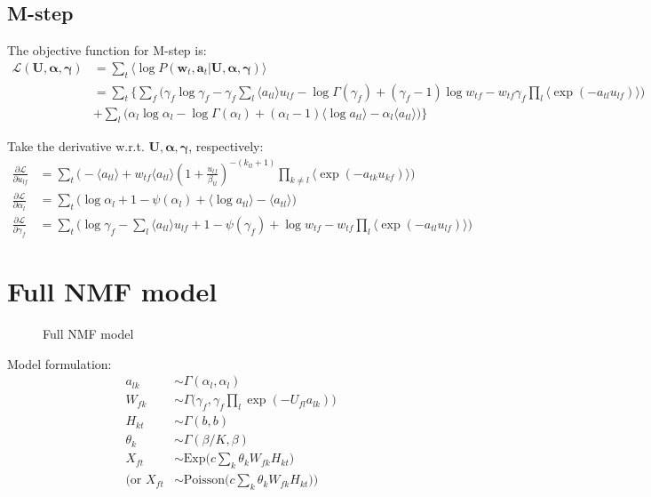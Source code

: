 \documentclass{article}
\begin{document}
\subsection{M-step}
The objective function for M-step is:
\begin{align*}
\mathcal{L}(\mathbf{U}, \bm{\alpha}, \bm{\gamma}) &= \sum_t \langle \log P(\bm{w}_t, \bm{a}_t | \mathbf{U}, \bm{\alpha}, \bm{\gamma}) \rangle \\
&= \sum_t  \biggl\{ \sum_f \Big( \gamma_f \log \gamma_f - \gamma_ f \sum_l \langle a_{tl} \rangle u_{lf} - \log\Gamma(\gamma_f) + (\gamma_f - 1)\log w_{tf} - w_{tf} \gamma_f \prod_l \langle \exp(-a_{tl} u_{lf}) \rangle \Big)  \\
&+ \sum_l  \Big( \alpha_l \log \alpha_l - \log \Gamma(\alpha_l) + (\alpha_l - 1)\langle \log a_{tl} \rangle - \alpha_l \langle a_{tl}  \rangle \Big) \biggl\}
\end{align*}

Take the derivative w.r.t. $\mathbf{U}, \bm{\alpha}, \bm{\gamma}$, respectively:
\begin{align*}
\frac{\partial \mathcal{L}}{\partial u_{lf}} &= \sum_t \biggl( - \langle a_{tl} \rangle + w_{tf} \langle a_{tl} \rangle (1 + \frac{u_{lf}}{\beta_{tl}})^{-(k_{tl}+1)}  \prod_{k \neq l} \langle \exp(-a_{tk} u_{kf}) \rangle \biggl)\\
\frac{\partial \mathcal{L}}{\partial \alpha_l} &=  \sum_t \biggl( \log \alpha_l + 1 - \psi(\alpha_l) + \langle \log a_{tl} \rangle - \langle a_{tl} \rangle \biggl)\\
\frac{\partial \mathcal{L}}{\partial \gamma_f} &= \sum_t \biggl( \log \gamma_f - \sum_l \langle a_{tl} \rangle u_{lf} + 1 - \psi(\gamma_f) + \log w_{tf} - w_{tf} \prod_l \langle \exp(-a_{tl} u_{lf}) \rangle \biggl)
\end{align*}

\section{Full NMF model}
\begin{figure}[ht]
  \centering
      
  \caption{Full NMF model}
\label{fig:plate}
\end{figure}

Model formulation:
\begin{align*}
a_{lk} &\sim \Gamma(\alpha_l, \alpha_l)\\
W_{fk} &\sim \Gamma\Big(\gamma_f, \gamma_f \prod_l \exp(-U_{fl} a_{lk})\Big)\\
H_{kt} &\sim \Gamma(b, b)\\
\theta_k &\sim \Gamma(\beta/K, \beta)\\
X_{ft} &\sim \text{Exp}\Big(c \sum_k \theta_k W_{fk} H_{kt}\Big)\\
\biggl(\text{or } X_{ft} &\sim \text{Poisson}\Big(c \sum_k \theta_k W_{fk} H_{kt}\Big)\biggl)
\end{align*}
\end{document}
